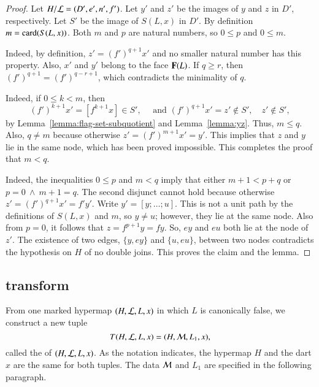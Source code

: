 \begin{proof}
Let $H/{\cal L}=(D',e',n',f')$.  Let $y'$ and $z'$ be the images of $y$ and $z$
in $D'$, respectively.  Let $S'$ be the image of $S(L,x)$ in $D'$.
By definition $m = {\operatorname{card}}(S(L,x))$.  Both $m$ and $p$ are natural numbers,
so $0\le p$ and $0\le m$. 


  Indeed,
by definition, $z' = (f')^{q+1} x'$ and no smaller natural
number has this property.  Also, $x'$ and $y'$ belong to the face ${\mathbf F}(L)$.
If $q\ge r$, then $(f')^{q+1} = (f')^{q-r+1}$, which contradicts the minimality of $q$.

 Indeed, if $0\le k< m$, then
\[ 
(f')^{k+1} x' = [f^{k+1} x]\in S',\quad \text{ and } (f')^{q+1}x' = z'\not\in S',
 \quad z' \not\in S',
\] 
by Lemma~\ref{lemma:flag-set-subquotient} and Lemma~\ref{lemma:yz}.
Thus, $m\le q$.  Also, $q\ne m$ because otherwise $z' = (f')^{m+1} x'
= y'$.  This implies that $z$ and $y$ lie in the same node, which has
been proved impossible.  This completes the proof that $m<q$.
 
  Indeed, the inequalities $0\le p$ and $m<q$ imply
that either $m+1 < p+q$ or $p=0~\land~m+1=q$.  The second disjunct
cannot hold because otherwise $z' = (f')^{q+1} x' = f' y'$.  Write $y' = [y;\ldots;u]$.
This is not a unit path by the definitions of $S(L,x)$ and $m$, so $y\ne u$; however,
they lie at the same node.  Also from $p=0$, it follows that $z= f^{p+1} y = f y$.
So, $e y$ and $e u$ both lie at the node of $z'$.  The existence of
 two edges, $\{y, e y\}$ and
$\{u, e u\}$, between two nodes contradicts the hypothesis
on $H$ of no double joins.  This proves the claim and the lemma.
\end{proof}

\subsection{transform}

%
\begin{definition}[transform]\label{def:transform}
  From one marked hypermap $(H,{\cal L},L,x)$ in which $L$ is
  canonically false, we construct a new tuple
\[ 
T(H,{\cal L},L,x) = (H,{\cal M},L_1,x),
\] 
 called the  of
  $(H,{\cal{L}},L,x)$.  
As the notation indicates, the hypermap $H$ and the dart $x$ are the same for both
tuples.  The data ${\cal M}$ and $L_1$ are specified in
the following paragraph.
\end{definition}

